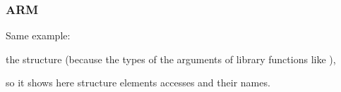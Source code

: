 ﻿\subsubsection{ARM}

\myparagraph{\OptimizingKeilVI (\ThumbMode)}

Same example:



\myparagraph{\OptimizingXcodeIV (\ThumbTwoMode)}

\IDA {} the  structure 
(because \IDA {} the types of the arguments of library functions like ), 

so it shows here structure elements accesses and their names.


